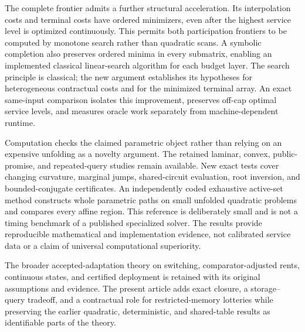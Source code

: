 The complete frontier admits a further structural acceleration. Its interpolation costs and terminal costs have ordered minimizers, even after the highest service level is optimized continuously. This permits both participation frontiers to be computed by monotone search rather than quadratic scans. A symbolic completion also preserves ordered minima in every submatrix, enabling an implemented classical linear-search algorithm for each budget layer. The search principle is classical; the new argument establishes its hypotheses for heterogeneous contractual costs and for the minimized terminal array. An exact same-input comparison isolates this improvement, preserves off-cap optimal service levels, and measures oracle work separately from machine-dependent runtime.

Computation checks the claimed parametric object rather than relying on an expensive unfolding as a novelty argument. The retained laminar, convex, public-promise, and repeated-query studies remain available. New exact tests cover changing curvature, marginal jumps, shared-circuit evaluation, root inversion, and bounded-conjugate certificates. An independently coded exhaustive active-set method constructs whole parametric paths on small unfolded quadratic problems and compares every affine region. This reference is deliberately small and is not a timing benchmark of a published specialized solver. The results provide reproducible mathematical and implementation evidence, not calibrated service data or a claim of universal computational superiority.

The broader accepted-adaptation theory on switching, comparator-adjusted rents, continuous states, and certified deployment is retained with its original assumptions and evidence. The present article adds exact closure, a storage--query tradeoff, and a contractual role for restricted-memory lotteries while preserving the earlier quadratic, deterministic, and shared-table results as identifiable parts of the theory.
